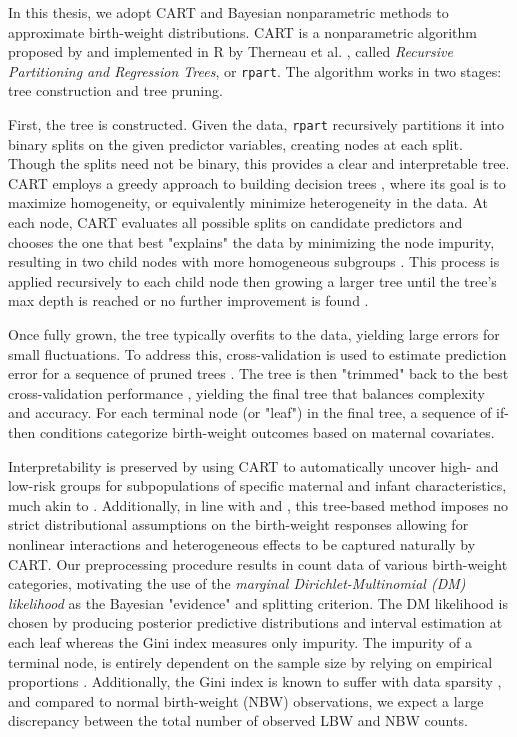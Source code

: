 In this thesis, we adopt CART and Bayesian nonparametric methods to approximate birth-weight distributions. CART is a nonparametric algorithm proposed by \textcite{breiman1984classification} and implemented in R by Therneau et al. \parencite{intro_to_rpart}, called \textit{Recursive Partitioning and Regression Trees}, or \texttt{rpart}. The algorithm works in two stages: tree construction and tree pruning. 
 
First, the tree is constructed. Given the data, \texttt{rpart} recursively partitions it into binary splits on the given predictor variables, creating nodes at each split. Though the splits need not be binary, this provides a clear and interpretable tree. CART employs a greedy approach to building decision trees \parencite{cart_greedy}, where its goal is to maximize homogeneity, or equivalently minimize heterogeneity in the data. At each node, CART evaluates all possible splits on candidate predictors and chooses the one that best "explains" the data by minimizing the node impurity, resulting in two child nodes with more homogeneous subgroups \parencite{intro_to_rpart}. This process is applied recursively to each child node then growing a larger tree until the tree's max depth is reached or no further improvement is found \parencite{intro_to_rpart}.

Once fully grown, the tree typically overfits to the data, yielding large errors for small fluctuations. To address this, cross-validation is used to estimate prediction error for a sequence of pruned trees \parencite{intro_to_rpart}. The tree is then "trimmed" back to the best cross-validation performance \parencite{intro_to_rpart}, yielding the final tree that balances complexity and accuracy. For each terminal node (or "leaf") in the final tree, a sequence of if-then conditions categorize birth-weight outcomes based on maternal covariates.

Interpretability is preserved by using CART to automatically uncover high- and low-risk groups for subpopulations of specific maternal and infant characteristics, much akin to \textcite{KITSANTAS2006275}. Additionally, in line with \textcite{dunson2008} and \textcite{jain2024}, this tree-based method imposes no strict distributional assumptions on the birth-weight responses allowing for nonlinear interactions and heterogeneous effects to be captured naturally by CART. Our preprocessing procedure results in count data of various birth-weight categories, motivating the use of the \emph{marginal Dirichlet-Multinomial (DM) likelihood} as the Bayesian "evidence" and splitting criterion. The DM likelihood is chosen by producing posterior predictive distributions and interval estimation at each leaf whereas the Gini index measures only impurity. The impurity of a terminal node, is entirely dependent on the sample size by relying on empirical proportions \parencite{stackexchangeGiniDecrease}. Additionally, the Gini index is known to suffer with data sparsity \parencite{ekamperiDecisionTrees}, and compared to normal birth-weight (NBW) observations, we expect a large discrepancy between the total number of observed LBW and NBW counts.

